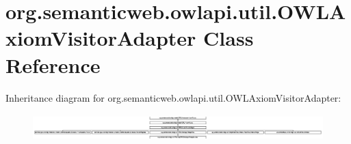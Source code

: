 \hypertarget{classorg_1_1semanticweb_1_1owlapi_1_1util_1_1_o_w_l_axiom_visitor_adapter}{\section{org.\-semanticweb.\-owlapi.\-util.\-O\-W\-L\-Axiom\-Visitor\-Adapter Class Reference}
\label{classorg_1_1semanticweb_1_1owlapi_1_1util_1_1_o_w_l_axiom_visitor_adapter}
}
Inheritance diagram for org.\-semanticweb.\-owlapi.\-util.\-O\-W\-L\-Axiom\-Visitor\-Adapter\-:\begin{figure}[H]
\begin{center}
\leavevmode
\includegraphics[height=1.062619cm]{classorg_1_1semanticweb_1_1owlapi_1_1util_1_1_o_w_l_axiom_visitor_adapter}
\end{center}
\end{figure}
